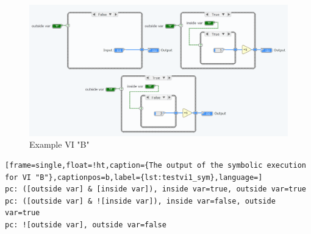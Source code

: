 \begin{figure}
\centering
\includegraphics[width=150mm,keepaspectratio]{figures/testvi2.png}
\caption{Example VI "B"} 
\label{fig:testvi2}
\end{figure}


\begin{lstlisting}[frame=single,float=!ht,caption={The output of the symbolic execution for VI "B"},captionpos=b,label={lst:testvi1_sym},language=]
pc: ([outside var] & [inside var]), inside var=true, outside var=true
pc: ([outside var] & ![inside var]), inside var=false, outside var=true
pc: ![outside var], outside var=false
\end{lstlisting}

